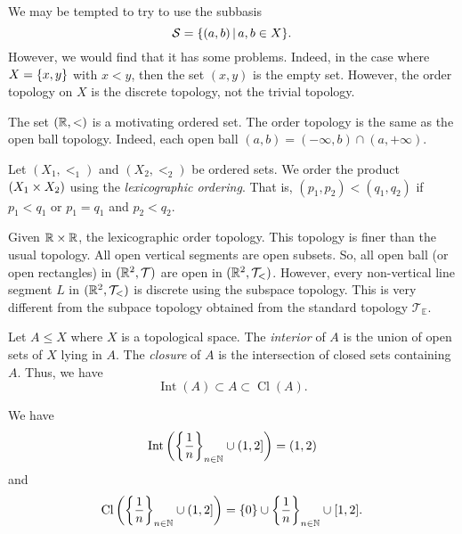 \documentclass[12pt]{book} %
\newcommand{\T}{\mathcal T}
\DeclareMathOperator{\Int}{Int}
\DeclareMathOperator{\Cl}{Cl}
\begin{document}
\begin{remark}
We may be tempted to try to use the subbasis
\[ \mathcal S = \set{(a, b) \given a, b \in X}. \]
However, we would find that it has some problems.
Indeed, in the case where \( X = \{x, y\} \) with \( x < y \), then the set \( (x, y) \) is the empty set.
However, the order topology on \( X \) is the discrete topology, not the trivial topology.
\end{remark}

\begin{example}
The set \( (\mathbb{R}, <) \) is a motivating ordered set.
The order topology is the same as the open ball topology.
Indeed, each open ball \( (a, b) = (-\infty, b) \cap (a, +\infty) \).
\end{example}

\begin{definition}
Let \( (X_1, <_1) \) and \( (X_2, <_2) \) be ordered sets.
We order the product \( (X_1 \times X_2) \) using the \emph{lexicographic ordering}.
That is, \( (p_1, p_2) < (q_1, q_2) \) if \( p_1 < q_1 \) or \( p_1 = q_1 \) and \( p_2 < q_2 \).
\end{definition}

\begin{example}
Given \( \mathbb{R} \times \mathbb{R} \), the lexicographic order topology.
This topology is finer than the usual topology.
All open vertical segments are open subsets.
So, all open ball (or open rectangles) in \( (\R^2, \T) \) are open in \( (\R^2, \T_<) \).
However, every non-vertical line segment \( L \) in \( (\R^2, \T_<) \) is discrete using the subspace topology.
This is very different from the subpace topology obtained from the standard topology \( \T_{\mathbb E} \).
\end{example}

\begin{definition}
Let \( A \leq X \) where \( X \) is a topological space.
The \emph{interior} of \( A \) is the union of open sets of \( X \) lying in \( A \).
The \emph{closure} of \( A \) is the intersection of closed sets containing \( A \).
Thus, we have
\[ \Int(A) \subset A \subset \Cl(A). \]
\end{definition}

\begin{example}
We have
\[ \Int \left ( \set*{\frac 1 n}_{n \in \N} \cup (1, 2] \right ) = (1, 2) \]
and
\[ \Cl \left ( \set*{\frac 1 n}_{n \in \N} \cup (1, 2] \right ) = \set 0 \cup \set*{\frac 1 n}_{n \in \N} \cup [1, 2]. \]
\end{example}
\end{document}
